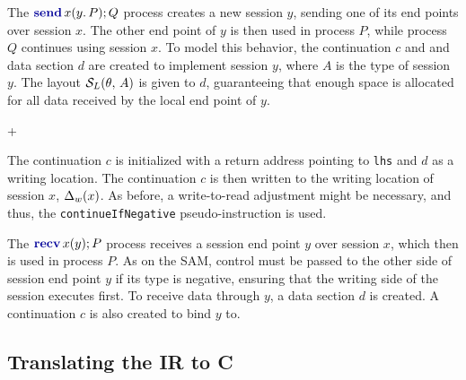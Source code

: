\documentclass[sigconf,nonacm,natbib=true]{acmart}
\begin{document}
The $\sendc{x}{y}{P}Q$ process creates a new session $y$, sending one of its end points over session $x$. The other end point of $y$ is then used in process $P$, while process $Q$ continues using session $x$. To model this behavior, the continuation $c$ and and data section $d$ are created to implement session $y$, where $A$ is the type of session $y$. The layout $\mathcal{S}_L(\theta,\,A)$ is given to $d$, guaranteeing that enough space is allocated for all data received by the local end point of $y$.

\begin{compilationacm}{\theta}{\Delta}{}
{ + }
     
\end{compilationacm}

The continuation $c$ is initialized with a return address pointing to \texttt{lhs} and $d$ as a writing location. The continuation $c$ is then written to the writing location of session $x$, $\Delta_w(x)$. As before, a write-to-read adjustment might be necessary, and thus, the \texttt{continueIfNegative} pseudo-instruction is used.

The $\recvc{x}{y}P$ process receives a session end point $y$ over session $x$, which then is used in process $P$. As on the \ac{SAM}, control must be passed to the other side of session end point $y$ if its type is negative, ensuring that the writing side of the session executes first. To receive data through $y$, a data section $d$ is created. A continuation $c$ is also created to bind $y$ to.
\begin{compilationacm}{\theta}{\Delta}{}
{}
     
\end{compilationacm}

\subsection{Translating the IR to C}
\end{document}
